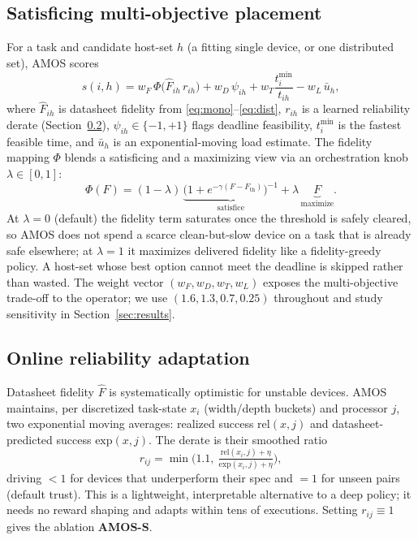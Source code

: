 \documentclass[conference]{IEEEtran}
\begin{document}
\subsection{Satisficing multi-objective placement}
For a task and candidate host-set $h$ (a fitting single device, or one
distributed set), AMOS scores
\begin{equation}
s(i,h)=w_F\,\Phi\!\big(\hat{F}_{ih}\,r_{ih}\big)+w_D\,\psi_{ih}
+w_T\frac{t^{\min}_i}{t_{ih}}-w_L\,\bar{u}_h,
\label{eq:score}
\end{equation}
where $\hat{F}_{ih}$ is datasheet fidelity from
\eqref{eq:mono}--\eqref{eq:dist}, $r_{ih}$ is a learned reliability derate
(Section~\ref{sec:learn}), $\psi_{ih}\!\in\!\{-1,+1\}$ flags deadline
feasibility, $t^{\min}_i$ is the fastest feasible time, and $\bar{u}_h$ is an
exponential-moving load estimate. The fidelity mapping $\Phi$ blends a
satisficing and a maximizing view via an orchestration knob
$\lambda\!\in\![0,1]$:
\begin{equation}
\Phi(F)=(1-\lambda)\,\underbrace{\big(1+e^{-\gamma(F-F_{\text{th}})}\big)^{-1}}_{\text{satisfice}}
+\lambda\,\underbrace{F}_{\text{maximize}} .
\label{eq:phi}
\end{equation}
At $\lambda\!=\!0$ (default) the fidelity term saturates once the threshold is
safely cleared, so AMOS does not spend a scarce clean-but-slow device on a task
that is already safe elsewhere; at $\lambda\!=\!1$ it maximizes delivered fidelity
like a fidelity-greedy policy. A host-set whose best option cannot meet the
deadline is skipped rather than wasted. The weight vector
$(w_F,w_D,w_T,w_L)$ exposes the multi-objective trade-off to the operator; we use
$(1.6,1.3,0.7,0.25)$ throughout and study sensitivity in
Section~\ref{sec:results}.

\subsection{Online reliability adaptation}
\label{sec:learn}
Datasheet fidelity $\hat{F}$ is systematically optimistic for unstable devices.
AMOS maintains, per discretized task-state $x_i$ (width/depth buckets) and
processor $j$, two exponential moving averages: realized success
$\mathrm{rel}(x,j)$ and datasheet-predicted success $\mathrm{exp}(x,j)$. The
derate is their smoothed ratio
\begin{equation}
r_{ij}=\min\!\Big(1.1,\ \tfrac{\mathrm{rel}(x_i,j)+\eta}{\mathrm{exp}(x_i,j)+\eta}\Big),
\end{equation}
driving $<\!1$ for devices that underperform their spec and $=\!1$ for unseen
pairs (default trust). This is a lightweight, interpretable alternative to a deep
policy; it needs no reward shaping and adapts within tens of executions. Setting
$r_{ij}\!\equiv\!1$ gives the ablation \textbf{AMOS-S}.
\end{document}
